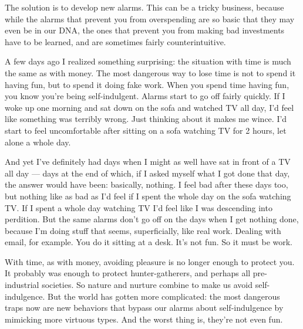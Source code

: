 The solution is to
                  develop new alarms. This can be a tricky business, because
                  while the alarms that prevent you from overspending are so
                  basic that they may even be in our DNA, the ones that prevent
                  you from making bad investments have to be learned, and are
                  sometimes fairly counterintuitive.

A few days ago I
                  realized something surprising: the situation with time is much
                  the same as with money. The most dangerous way to lose time is
                  not to spend it having fun, but to spend it doing fake work.
                  When you spend time having fun, you know you're being
                  self-indulgent. Alarms start to go off fairly quickly. If I
                  woke up one morning and sat down on the sofa and watched TV
                  all day, I'd feel like something was terribly wrong. Just
                  thinking about it makes me wince. I'd start to feel
                  uncomfortable after sitting on a sofa watching TV for 2 hours,
                  let alone a whole day.

And yet I've definitely had
                  days when I might as well have sat in front of a TV all day
                  --- days at the end of which, if I asked myself what I got
                  done that day, the answer would have been: basically, nothing.
                  I feel bad after these days too, but nothing like as bad as
                  I'd feel if I spent the whole day on the sofa watching TV. If
                  I spent a whole day watching TV I'd feel like I was descending
                  into perdition. But the same alarms don't go off on the days
                  when I get nothing done, because I'm doing stuff that seems,
                  superficially, like real work. Dealing with email, for
                  example. You do it sitting at a desk. It's not fun. So it must
                  be work.

With time, as with money, avoiding
                  pleasure is no longer enough to protect you. It probably was
                  enough to protect hunter-gatherers, and perhaps all
                  pre-industrial societies. So nature and nurture combine to
                  make us avoid self-indulgence. But the world has gotten more
                  complicated: the most dangerous traps now are new behaviors
                  that bypass our alarms about self-indulgence by mimicking more
                  virtuous types. And the worst thing is, they're not even
                  fun.






